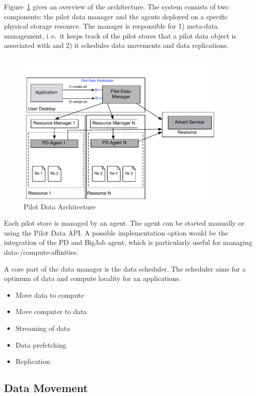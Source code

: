 \documentclass[]{article}
\begin{document}
Figure~\ref{fig:figures_distributed_pilot_job} gives an overview of the
architecture. The system consists of two components: the pilot data manager and
the agents deployed on a specific physical storage resource. The manager is
responsible for 1) meta-data management, i.\,e.\ it keeps track of the pilot
stores that a pilot data object is associated with and 2) it schedules data
movements and data replications.

\begin{figure}[htbp]
    \centering
        \includegraphics[height=3in]{figures/pilot-data-manager.pdf}
    \caption{Pilot Data Architecture}
    \label{fig:figures_distributed_pilot_job}
\end{figure}

Each pilot store is managed by an agent. The agent can be started manually or 
using the Pilot Data API. A possible implementation option would be the 
integration of the PD and BigJob agent, which is particularly useful for 
managing data-/compute-affinities.

A core part of the data manager is the data scheduler. The scheduler aims for a 
optimum of data and compute locality for an applications.
\begin{itemize}
	\item Move data to compute
	\item Move computer to data
	\item Streaming of data
	\item Data prefetching 
	\item Replication
\end{itemize}



\subsection{Data Movement}
\end{document}
